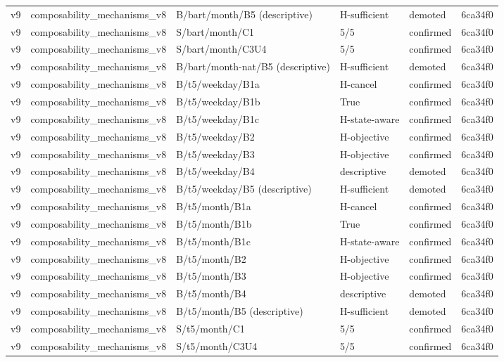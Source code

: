 \begin{longtable}{llllll}
v9 & composability\_mechanisms\_v8 & B/bart/month/B5 (descriptive) & H-sufficient & demoted & 6ca34f0 \\
v9 & composability\_mechanisms\_v8 & S/bart/month/C1 & 5/5 & confirmed & 6ca34f0 \\
v9 & composability\_mechanisms\_v8 & S/bart/month/C3U4 & 5/5 & confirmed & 6ca34f0 \\
v9 & composability\_mechanisms\_v8 & B/bart/month-nat/B5 (descriptive) & H-sufficient & demoted & 6ca34f0 \\
v9 & composability\_mechanisms\_v8 & B/t5/weekday/B1a & H-cancel & confirmed & 6ca34f0 \\
v9 & composability\_mechanisms\_v8 & B/t5/weekday/B1b & True & confirmed & 6ca34f0 \\
v9 & composability\_mechanisms\_v8 & B/t5/weekday/B1c & H-state-aware & confirmed & 6ca34f0 \\
v9 & composability\_mechanisms\_v8 & B/t5/weekday/B2 & H-objective & confirmed & 6ca34f0 \\
v9 & composability\_mechanisms\_v8 & B/t5/weekday/B3 & H-objective & confirmed & 6ca34f0 \\
v9 & composability\_mechanisms\_v8 & B/t5/weekday/B4 & descriptive & demoted & 6ca34f0 \\
v9 & composability\_mechanisms\_v8 & B/t5/weekday/B5 (descriptive) & H-sufficient & demoted & 6ca34f0 \\
v9 & composability\_mechanisms\_v8 & B/t5/month/B1a & H-cancel & confirmed & 6ca34f0 \\
v9 & composability\_mechanisms\_v8 & B/t5/month/B1b & True & confirmed & 6ca34f0 \\
v9 & composability\_mechanisms\_v8 & B/t5/month/B1c & H-state-aware & confirmed & 6ca34f0 \\
v9 & composability\_mechanisms\_v8 & B/t5/month/B2 & H-objective & confirmed & 6ca34f0 \\
v9 & composability\_mechanisms\_v8 & B/t5/month/B3 & H-objective & confirmed & 6ca34f0 \\
v9 & composability\_mechanisms\_v8 & B/t5/month/B4 & descriptive & demoted & 6ca34f0 \\
v9 & composability\_mechanisms\_v8 & B/t5/month/B5 (descriptive) & H-sufficient & demoted & 6ca34f0 \\
v9 & composability\_mechanisms\_v8 & S/t5/month/C1 & 5/5 & confirmed & 6ca34f0 \\
v9 & composability\_mechanisms\_v8 & S/t5/month/C3U4 & 5/5 & confirmed & 6ca34f0 \\

\end{longtable}
